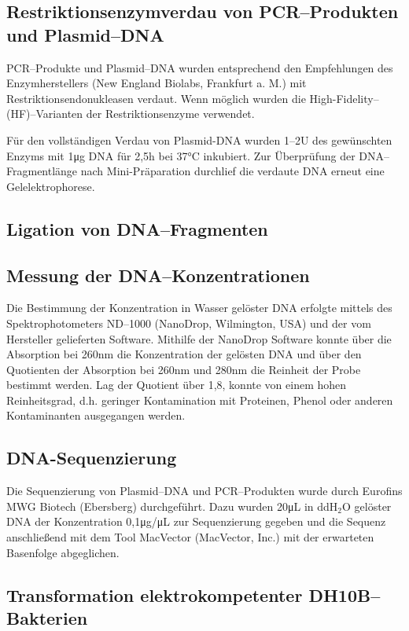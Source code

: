 \subsection{Restriktionsenzymverdau von PCR--Produkten und Plasmid--DNA}
PCR--Produkte und Plasmid--DNA wurden entsprechend den Empfehlungen des Enzymherstellers (New England Biolabs, Frankfurt a. M.) mit Restriktionsendonukleasen verdaut. Wenn möglich wurden die High-Fidelity--(HF)--Varianten der Restriktionsenzyme verwendet. 

Für den vollständigen Verdau von Plasmid-DNA wurden 1--2\si{U} des gewünschten Enzyms mit 1\si{\micro\gram} DNA für 2,5\si{\hour} bei 37\si{\celsius} inkubiert. Zur Überprüfung der DNA--Fragmentlänge nach Mini-Präparation durchlief die verdaute DNA erneut eine Gelelektrophorese. 

\subsection{Ligation von DNA--Fragmenten}

\subsection{Messung der DNA--Konzentrationen}
Die Bestimmung der Konzentration in Wasser gelöster DNA erfolgte mittels des Spektrophotometers ND--1000 (NanoDrop, Wilmington, USA) und der vom Hersteller gelieferten Software. Mithilfe der NanoDrop Software konnte über die Absorption bei 260\si{\nano\meter} die Konzentration der gelösten DNA und über den Quotienten der Absorption bei 260\si{\nano\meter} und 280\si{\nano\meter} die Reinheit der Probe bestimmt werden. Lag der Quotient über 1,8, konnte von einem hohen Reinheitsgrad, d.h. geringer Kontamination mit Proteinen, Phenol oder anderen Kontaminanten ausgegangen werden.

\subsection{DNA-Sequenzierung}
Die Sequenzierung von Plasmid--DNA und PCR--Produkten wurde durch Eurofins MWG Biotech (Ebersberg) durchgeführt. Dazu wurden 20\si{\micro\liter} in ddH$_2$O gelöster DNA der Konzentration 0,1\si{\micro\gram/\micro\liter} zur Sequenzierung gegeben und die Sequenz anschließend mit dem Tool MacVector (MacVector, Inc.) mit der erwarteten Basenfolge abgeglichen.

\subsection{Transformation elektrokompetenter DH10B--Bakterien}

